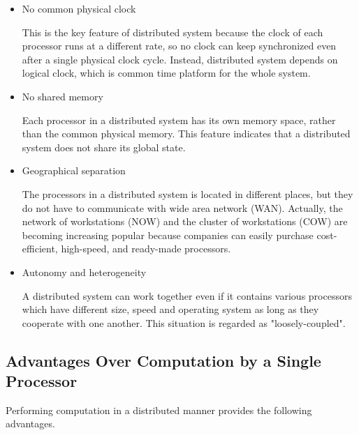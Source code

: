  \begin{itemize}
 
      \item No common physical clock 
      
      This is the key feature of distributed system because the clock of each processor runs at a different rate, so no clock can keep synchronized even after a single physical clock cycle.  Instead, distributed system depends on logical clock, which is common time platform for the whole system.
      
     \item No shared memory
     
     Each processor in a distributed system has its own memory space, rather than the common physical memory.  This feature indicates that a distributed system does not share its global state.
     
     
      \item Geographical separation
      
      The processors in a distributed system is located in different places, but they do not have to communicate with wide area network (WAN).  Actually, the network of workstations (NOW) and the cluster of workstations (COW) are becoming increasing popular because companies can easily purchase cost-efficient, high-speed, and ready-made processors. 
      
     \item Autonomy and heterogeneity
     
     A distributed system can work together even if it contains various processors which have different size, speed and operating system as long as they cooperate with one another.  This situation is regarded as "loosely-coupled".
     
\end{itemize}

\subsection{Advantages Over Computation by a Single Processor}

Performing computation in a distributed manner provides the following advantages.

